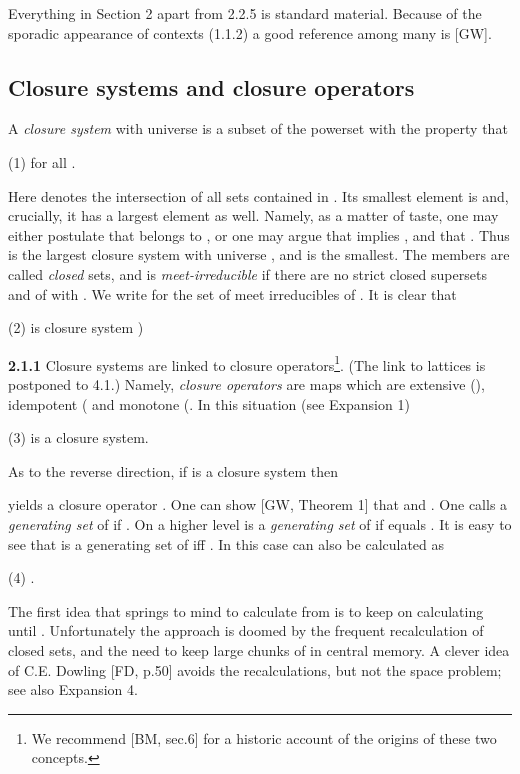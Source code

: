 \documentclass[11pt]{article}
\begin{document}
Everything in Section 2 apart from 2.2.5 is standard material.
Because of the sporadic appearance of contexts (1.1.2) a good reference among many is [GW].






\subsection{Closure systems and closure operators}

A {\it closure system}  with universe  is a subset of the powerset  with the property that

(1) \quad  for all .

Here  denotes the intersection of all sets contained in . Its smallest element is  and, crucially, it has a largest element as well. Namely, as a matter of taste, one may either postulate that  belongs to , or one may argue that  implies , and that . Thus  is the largest closure system with universe , and  is the smallest. The members  are called {\it closed} sets, and  is 
{\it meet-irreducible} if there are no strict closed supersets  and  of  with . We write  for the set of meet irreducibles of . It is clear that

(2)  \quad  is closure system )




{\bf 2.1.1} Closure systems are linked to closure operators\footnote{We recommend [BM, sec.6] for a historic account of the origins of these two concepts.}. (The link to lattices is postponed to 4.1.) Namely, {\it closure operators} are maps  which are extensive (), idempotent ( and monotone (. In this situation (see Expansion 1)

(3) \quad  is a closure system.

As to the reverse direction, 
if  is a closure system then

yields a closure operator . 
One can show [GW, Theorem 1] that  and . One calls  a {\it generating set} of  if . On a higher level  is a {\it generating set} of  if  equals . It is easy to see that  is a generating set of  iff . In this case
 can also be calculated as 

(4) \quad .


The first idea that springs to mind to calculate  from  is to keep on calculating  until . Unfortunately the approach is doomed by the frequent recalculation of closed sets, and the need to keep large chunks of  in central memory. A clever idea of C.E. Dowling [FD, p.50] avoids the recalculations, but not the space problem; see also Expansion 4. 
\end{document}
